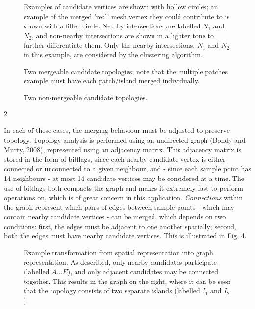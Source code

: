 \documentclass[]{article}
\begin{document}
\begin{figure}[htb]
    \centering
    
    \caption{Examples of candidate vertices are shown with hollow circles; an example of the merged 'real' mesh vertex they could contribute to is shown with a filled circle. Nearby intersections are labelled $N_1$ and $N_2$, and non-nearby intersections are shown in a lighter tone to further differentiate them. Only the nearby intersections, $N_1$ and $N_2$ in this example, are considered by the clustering algorithm.}
    \label{fig:candidates}
\end{figure}

\begin{figure}[htb]
    \centering
    
    \caption{Two mergeable candidate topologies; note that the multiple patches example must have each patch/island merged individually.}
    \label{fig:topologies1}
\end{figure}

\begin{figure}[htb]
    \centering
    
    \caption{Two non-mergeable candidate topologies.}
    \label{fig:topologies2}
\end{figure}

\FloatBarrier
\begin{multicols}{2}

In each of these cases, the merging behaviour must be adjusted to preserve topology. Topology analysis is performed using an undirected graph (Bondy and Murty, 2008), represented using an adjacency matrix. This adjacency matrix is stored in the form of bitflags, since each nearby candidate vertex is either connected or unconnected to a given neighbour, and - since each sample point has 14 neighbours - at most 14 candidate vertices may be considered at a time. The use of bitflags both compacts the graph and makes it extremely fast to perform operations on, which is of great concern in this application. \emph{\textquotesingle Connections\textquotesingle{}} within the graph represent which pairs of edges between sample points - which may contain nearby candidate vertices - can be merged, which depends on two conditions: first, the edges must be adjacent to one another spatially; second, both the edges must have nearby candidate vertices. This is illustrated in Fig. \ref{fig:mergeables}.

\end{multicols}
\begin{figure}[htb]
    \centering
    
    \caption{Example transformation from spatial representation into graph representation. As described, only nearby candidates participate (labelled $A\dots E$), and only adjacent candidates may be connected together. This results in the graph on the right, where it can be seen that the topology consists of two separate islands (labelled $I_1$ and $I_2$).}
    \label{fig:mergeables}
\end{figure}
\end{document}
